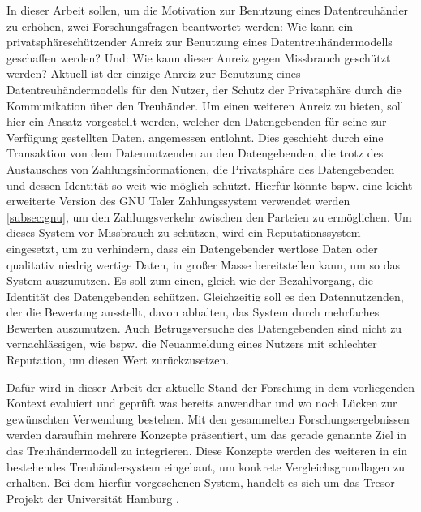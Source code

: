 \documentclass[11pt,a4paper]{scrreprt}
\begin{document}
In dieser Arbeit sollen, um die Motivation zur Benutzung eines Datentreuhänder zu erhöhen, zwei Forschungsfragen beantwortet werden: Wie kann ein privatsphäreschützender Anreiz zur Benutzung eines Datentreuhändermodells geschaffen werden? Und: Wie kann dieser Anreiz gegen Missbrauch geschützt werden? Aktuell ist der einzige Anreiz zur Benutzung eines Datentreuhändermodells für den Nutzer, der Schutz der Privatsphäre durch die Kommunikation über den Treuhänder. Um einen weiteren Anreiz zu bieten, soll hier ein Ansatz vorgestellt werden, welcher den Datengebenden für seine zur Verfügung gestellten Daten, angemessen entlohnt. Dies geschieht durch eine Transaktion von dem Datennutzenden an den Datengebenden, die trotz des Austausches von Zahlungsinformationen, die Privatsphäre des Datengebenden und dessen Identität so weit wie möglich schützt. Hierfür könnte bspw. eine leicht erweiterte Version des GNU Taler Zahlungssystem verwendet werden \ref{subsec:gnu}, um den Zahlungsverkehr zwischen den Parteien zu ermöglichen. Um dieses System vor Missbrauch zu schützen, wird ein Reputationssystem eingesetzt, um zu verhindern, dass ein Datengebender wertlose Daten oder qualitativ niedrig wertige Daten, in großer Masse bereitstellen kann, um so das System auszunutzen. Es soll zum einen, gleich wie der Bezahlvorgang, die Identität des Datengebenden schützen. Gleichzeitig soll es den Datennutzenden, der die Bewertung ausstellt, davon abhalten, das System durch mehrfaches Bewerten auszunutzen. Auch Betrugsversuche des Datengebenden sind nicht zu vernachlässigen, wie bspw. die Neuanmeldung eines Nutzers mit schlechter Reputation, um diesen Wert zurückzusetzen.

Dafür wird in dieser Arbeit der aktuelle Stand der Forschung in dem vorliegenden Kontext evaluiert und geprüft was bereits anwendbar und wo noch Lücken zur gewünschten Verwendung bestehen. Mit den gesammelten Forschungsergebnissen werden daraufhin mehrere Konzepte präsentiert, um das gerade genannte Ziel in das Treuhändermodell zu integrieren. Diese Konzepte werden des weiteren in ein bestehendes Treuhändersystem eingebaut, um konkrete Vergleichsgrundlagen zu erhalten. Bei dem hierfür vorgesehenen System, handelt es sich um das Tresor-Projekt der Universität Hamburg \cite{TRESOR}.


\end{document}
